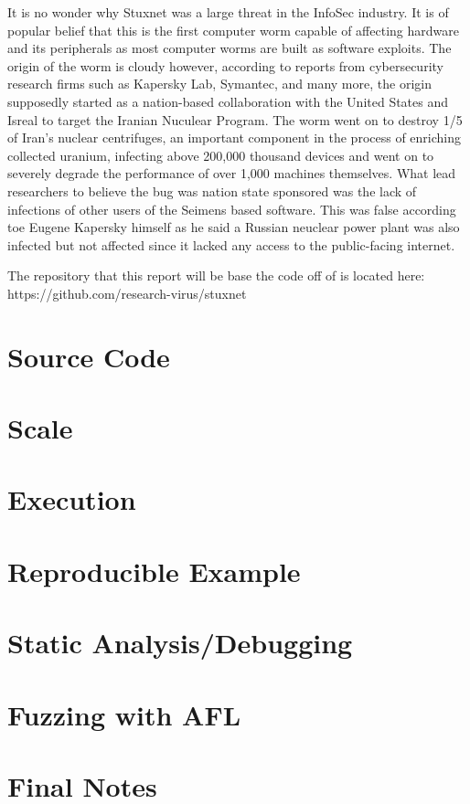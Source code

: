 \documentclass[12pt, letterpaper]{article}
\begin{document}
\begin{sloppypar}
\begin{flushleft}
It is no wonder why Stuxnet was a 
large threat in the InfoSec industry. It is of popular belief that this is
the first computer worm capable of affecting hardware and its peripherals as
most computer worms are built as software exploits. The origin of the worm is 
cloudy however, according to reports from cybersecurity research firms such 
as Kapersky Lab, Symantec, and many more, the origin supposedly started as 
a nation-based collaboration with the United States and Isreal to target the
Iranian Nuculear Program. The worm went on to destroy 1/5 of Iran's nuclear 
centrifuges, an important component in the process of enriching collected
uranium, infecting above 200,000 thousand devices and went on to severely 
degrade the performance of over 1,000 machines themselves. What lead 
researchers to believe the bug was nation state sponsored was the lack of
infections of other users of the Seimens based software. This was false 
according toe Eugene Kapersky himself as he said a Russian neuclear power
plant was also infected but not affected since it lacked any access to the
public-facing internet. 


The repository that this report will be base the code off of is located 
here: https://github.com/research-virus/stuxnet




\section{Source Code}



\section*{Scale}


\section*{Execution}


\section*{Reproducible Example}


\section*{Static Analysis/Debugging}


\section*{Fuzzing with AFL}


\section*{Final Notes}

\end{flushleft}
\end{sloppypar}
\end{document}
